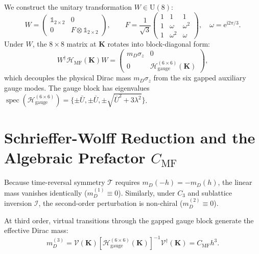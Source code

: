 We construct the unitary transformation $W \in \mathrm{U}(8)$:
\begin{equation}
W = \begin{pmatrix} \mathbb{1}_{2 \times 2} & 0 \\ 0 & F \otimes \mathbb{1}_{2 \times 2} \end{pmatrix}, \qquad F = \frac{1}{\sqrt{3}}\begin{pmatrix} 1 & 1 & 1 \\ 1 & \omega & \omega^2 \\ 1 & \omega^2 & \omega \end{pmatrix}, \quad \omega = \mathrm{e}^{\mathrm{i} 2\pi/3}.
\end{equation}
Under $W$, the $8 \times 8$ matrix at $\mathbf{K}$ rotates into block-diagonal form:
\begin{equation}
\label{eq:phase4_block_decoupled}
W^\dagger \mathcal{H}_{\mathrm{MF}}(\mathbf{K}) W = \begin{pmatrix} m_D \sigma_z & 0 \\ 0 & \mathcal{H}_{\mathrm{gauge}}^{(6 \times 6)}(\mathbf{K}) \end{pmatrix},
\end{equation}
which decouples the physical Dirac mass $m_D \sigma_z$ from the six gapped auxiliary gauge modes. The gauge block has eigenvalues $\operatorname{spec}(\mathcal{H}_{\mathrm{gauge}}^{(6 \times 6)}) = \{\pm \bar{U}, \pm \bar{U}, \pm \sqrt{\bar{U}^2 + 3\lambda^2}\}$.

\section{Schrieffer-Wolff Reduction and the Algebraic Prefactor $C_{\mathrm{MF}}$}
\label{sec:phase4_schrieffer_wolff}

Because time-reversal symmetry $\mathcal{T}$ requires $m_D(-h) = -m_D(h)$, the linear mass vanishes identically ($m_D^{(1)} \equiv 0$). Similarly, under $C_3$ and sublattice inversion $\mathcal{I}$, the second-order perturbation is non-chiral ($m_D^{(2)} \equiv 0$).

At third order, virtual transitions through the gapped gauge block generate the effective Dirac mass:
\begin{equation}
m_D^{(3)} = \mathcal{V}(\mathbf{K}) \left[ \mathcal{H}_{\mathrm{gauge}}^{(6 \times 6)}(\mathbf{K}) \right]^{-1} \mathcal{V}^\dagger(\mathbf{K}) = C_{\mathrm{MF}} h^3.
\end{equation}

